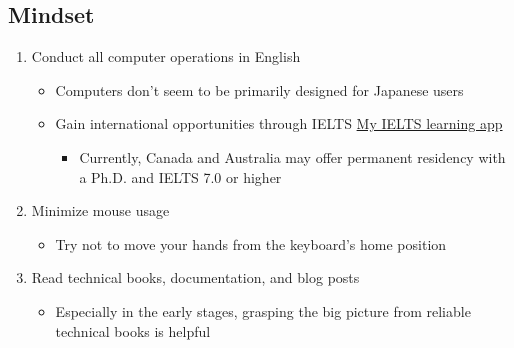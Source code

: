 \documentclass[a4paper,11pt]{article}
\begin{document}
\subsection{Mindset}
\begin{enumerate}
    \item Conduct all computer operations in English
    \begin{itemize}
        \item Computers don't seem to be primarily designed for Japanese users
        \item Gain international opportunities through IELTS \href{https://ai-ielts.app/}{My IELTS learning app}
        \begin{itemize}
            \item Currently, Canada and Australia may offer permanent residency with a Ph.D. and IELTS 7.0 or higher
        \end{itemize}
    \end{itemize}
    \item Minimize mouse usage
    \begin{itemize}
        \item Try not to move your hands from the keyboard's home position
    \end{itemize}
    \item Read technical books, documentation, and blog posts
    \begin{itemize}
        \item Especially in the early stages, grasping the big picture from reliable technical books is helpful
    \end{itemize}
\end{enumerate}
\end{document}

